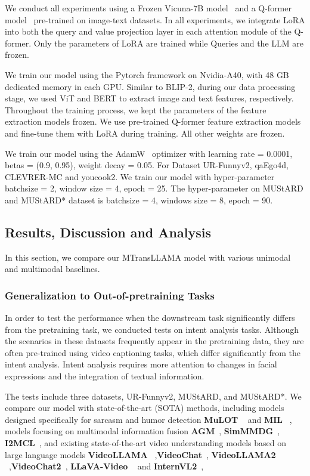 We conduct all experiments using a Frozen Vicuna-7B model~\cite{touvron2023llama} and a Q-former model~\cite{li2023blip} pre-trained on image-text datasets. In all experiments, we integrate LoRA into both the query and value projection layer in each attention module of the Q-former. Only the parameters of LoRA are trained while Queries and the LLM are frozen.

We train our model using the Pytorch framework on Nvidia-A40, with 48 GB dedicated memory in each GPU. Similar to BLIP-2, during our data processing stage, we used ViT and BERT to extract image and text features, respectively. Throughout the training process, we kept the parameters of the feature extraction models frozen. We use pre-trained Q-former feature extraction models and fine-tune them with LoRA during training. All other weights are frozen.

We train our model using the AdamW~\cite{loshchilov2017decoupled} optimizer with learning rate = 0.0001, betas = (0.9, 0.95), weight decay = 0.05.  For Dataset UR-Funnyv2, qaEgo4d, CLEVRER-MC and youcook2. We train our model with hyper-parameter batchsize = 2, window size = 4, epoch = 25. The hyper-parameter on MUStARD and MUStARD* dataset is batchsize = 4, windows size = 8, epoch = 90.


\subsection{Results, Discussion and Analysis}
In this section, we compare our MTransLLAMA model with various unimodal and multimodal baselines. 


\subsubsection{Generalization to Out-of-pretraining Tasks}

In order to test the performance when the downstream task significantly differs from the pretraining task, we conducted tests on intent analysis tasks. Although the scenarios in these datasets frequently appear in the pretraining data, they are often pre-trained using video captioning tasks, which differ significantly from the intent analysis. Intent analysis requires more attention to changes in facial expressions and the integration of textual information. 

The tests include three datasets, UR-Funnyv2, MUStARD, and MUStARD*. We compare our model with state-of-the-art (SOTA) methods, including models designed specifically for sarcasm and humor detection \textbf{MuLOT} ~\cite{pramanick2022multimodal} and \textbf{MIL} ~\cite{zhang2023learning}, models focusing on multimodal information fusion \textbf{AGM}~\cite{li2023boosting}, \textbf{SimMMDG}~\cite{dong2023simmmdg}, \textbf{I2MCL}~\cite{zhou2023intra}, and existing state-of-the-art video understanding models based on large language models \textbf{VideoLLAMA} ~\cite{zhang2023video},\textbf{VideoChat}~\cite{maaz2023video}, \textbf{VideoLLAMA2} ~\cite{cheng2024videollama},\textbf{VideoChat2}~\cite{li2023mvbench}, \textbf{LLaVA-Video} ~\cite{zhang2024video} and \textbf{InternVL2}~\cite{chen2024internvl}, 


